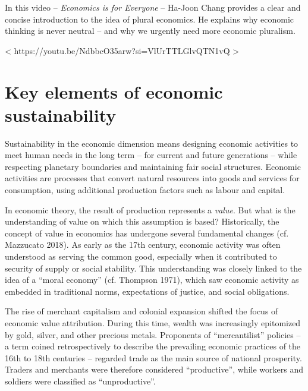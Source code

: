 \documentclass[
  a4paper,
  DIV=11,
  numbers=noendperiod,
  oneside,
  openany]{scrreprt}
\begin{document}
\begin{tcolorbox}
In this video -- \emph{Economics is for Everyone} -- Ha-Joon Chang
provides a clear and concise introduction to the idea of plural
economics. He explains why economic thinking is never neutral -- and why
we urgently need more economic pluralism.

{{< https://youtu.be/NdbbcO35arw?si=VlUrTTLGlvQTN1vQ >}}

\end{tcolorbox}

\section{Key elements of economic
sustainability}\label{key-elements-of-economic-sustainability}

Sustainability in the economic dimension means designing economic
activities to meet human needs in the long term -- for current and
future generations -- while respecting planetary boundaries and
maintaining fair social structures. Economic activities are processes
that convert natural resources into goods and services for consumption,
using additional production factors such as labour and capital.

In economic theory, the result of production represents a \emph{value}.
But what is the understanding of value on which this assumption is
based? Historically, the concept of value in economics has undergone
several fundamental changes (cf. Mazzucato 2018). As early as the 17th
century, economic activity was often understood as serving the common
good, especially when it contributed to security of supply or social
stability. This understanding was closely linked to the idea of a
``moral economy'' (cf. Thompson 1971), which saw economic activity as
embedded in traditional norms, expectations of justice, and social
obligations.

The rise of merchant capitalism and colonial expansion shifted the focus
of economic value attribution. During this time, wealth was increasingly
epitomized by gold, silver, and other precious metals. Proponents of
``mercantilist'' policies -- a term coined retrospectively to describe
the prevailing economic practices of the 16th to 18th centuries --
regarded trade as the main source of national prosperity. Traders and
merchants were therefore considered ``productive'', while workers and
soldiers were classified as ``unproductive''.
\end{document}
